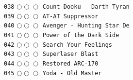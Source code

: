 \documentclass[a4paper,landscape]{article}
\begin{document}
\begin{multicols*}{5}
\texttt{038} \(\bigcirc\!\bigcirc\!\bigcirc\)  \texttt{Count Dooku - Darth Tyran} \vspace{-0.3mm}\\ 
\texttt{039} \(\bigcirc\!\bigcirc\!\bigcirc\)  \texttt{AT-AT Suppressor} \vspace{-0.3mm}\\ 
\texttt{040} \(\bigcirc\!\bigcirc\!\bigcirc\)  \texttt{Avenger - Hunting Star De} \vspace{-0.3mm}\\ 
\texttt{041} \(\bigcirc\!\bigcirc\!\bigcirc\)  \texttt{Power of the Dark Side} \vspace{-0.3mm}\\ 
\texttt{042} \(\bigcirc\!\bigcirc\!\bigcirc\)  \texttt{Search Your Feelings} \vspace{-0.3mm}\\ 
\texttt{043} \(\bigcirc\!\bigcirc\!\bigcirc\)  \texttt{Superlaser Blast} \vspace{-0.3mm}\\ 
\texttt{044} \(\bigcirc\!\bigcirc\!\bigcirc\)  \texttt{Restored ARC-170} \vspace{-0.3mm}\\ 
\texttt{045} \(\bigcirc\!\bigcirc\!\bigcirc\)  \texttt{Yoda - Old Master} \vspace{-0.3mm}\\ 

\end{multicols*}
\end{document}
